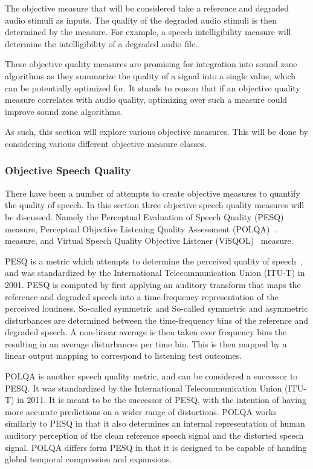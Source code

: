 The objective measure that will be considered take a reference and degraded audio stimuli as inputs.
The quality of the degraded audio stimuli is then determined by the measure.
For example, a speech intelligibility measure will determine the intelligibility of a degraded audio file.

These objective quality measures are promising for integration into sound zone algorithms as they summarize the 
quality of a signal into a single value, which can be potentially optimized for. 
It stands to reason that if an objective quality measure correlates with audio quality, optimizing over such a measure
could improve sound zone algorithms.

As such, this section will explore various objective measures.
This will be done by considering various different objective measure classes. 

\subsubsection{Objective Speech Quality}
There have been a number of attempts to create objective measures to quantify the quality of speech.
In this section three objective speech quality measures will be discussed.
Namely the Perceptual Evaluation of Speech Quality (PESQ)~\cite{rix2001perceptual} measure,
Perceptual Objective Listening Quality Assessment (POLQA)~\cite{beerends2013perceptual}. measure, and 
Virtual Speech Quality Objective Listener (ViSQOL)~\cite{hines2012visqol,chinen2020visqol} measure.

PESQ is a metric which attempts to determine the perceived quality of speech~\cite{rix2001perceptual}, 
and was standardized by the International Telecommunication Union (ITU-T) in 2001.
PESQ is computed by first applying an auditory transform that maps the reference and degraded speech into a 
time-frequency representation of the perceived loudness.
So-called symmetric and So-called symmetric and asymmetric disturbances are determined 
between the time-frequency bins of the reference and degraded speech. 
A non-linear average is then taken over frequency bins the resulting in an average disturbances per time bin.
This is then mapped by a linear output mapping to correspond to listening test outcomes.

POLQA is another speech quality metric, and can be considered a successor to PESQ.
It was standardized by the International Telecommunication Union (ITU-T) in 2011.
It is meant to be the successor of PESQ, with the intention of having more accurate predictions on a 
wider range of distortions.
POLQA works similarly to PESQ in that it also determines an internal representation of human auditory perception of the
clean reference speech signal and the distorted speech signal.
POLQA differs form PESQ in that it is designed to be capable of handing global temporal compression and expansions.

